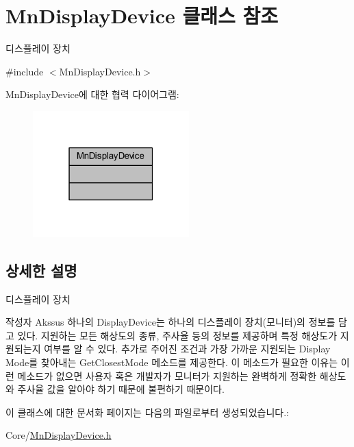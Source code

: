 \hypertarget{class_mn_display_device}{}\section{Mn\+Display\+Device 클래스 참조}
\label{class_mn_display_device}


디스플레이 장치  




{\ttfamily \#include $<$Mn\+Display\+Device.\+h$>$}



Mn\+Display\+Device에 대한 협력 다이어그램\+:
\nopagebreak
\begin{figure}[H]
\begin{center}
\leavevmode
\includegraphics[width=171pt]{class_mn_display_device__coll__graph}
\end{center}
\end{figure}


\subsection{상세한 설명}
디스플레이 장치 

\begin{DoxyAuthor}{작성자}
Akssus 하나의 Display\+Device는 하나의 디스플레이 장치(모니터)의 정보를 담고 있다. 지원하는 모든 해상도의 종류, 주사율 등의 정보를 제공하며 특정 해상도가 지원되는지 여부를 알 수 있다. 추가로 주어진 조건과 가장 가까운 지원되는 Display Mode를 찾아내는 Get\+Closest\+Mode 메소드를 제공한다. 이 메소드가 필요한 이유는 이런 메소드가 없으면 사용자 혹은 개발자가 모니터가 지원하는 완벽하게 정확한 해상도와 주사율 값을 알아야 하기 때문에 불편하기 때문이다. 
\end{DoxyAuthor}


이 클래스에 대한 문서화 페이지는 다음의 파일로부터 생성되었습니다.\+:\begin{DoxyCompactItemize}
\item 
Core/\hyperlink{_mn_display_device_8h}{Mn\+Display\+Device.\+h}\end{DoxyCompactItemize}
